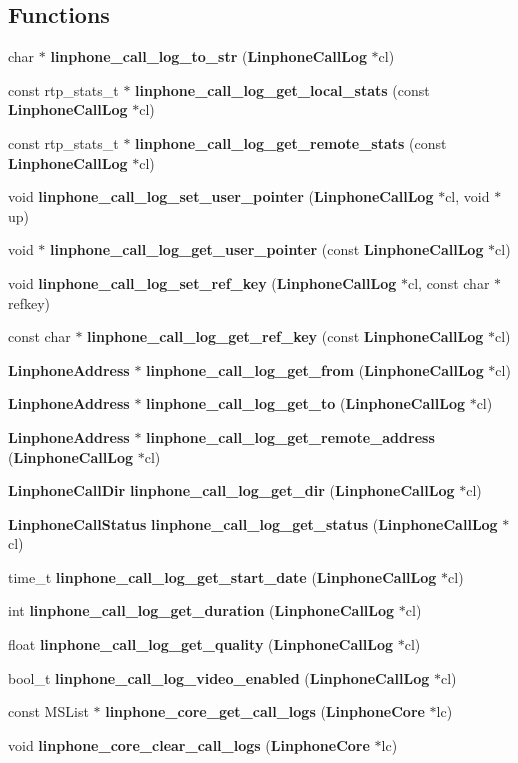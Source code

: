 \subsection*{Functions}
\begin{DoxyCompactItemize}
\item 
char $\ast$ {\bf linphone\-\_\-call\-\_\-log\-\_\-to\-\_\-str} ({\bf Linphone\-Call\-Log} $\ast$cl)
\item 
const rtp\-\_\-stats\-\_\-t $\ast$ {\bf linphone\-\_\-call\-\_\-log\-\_\-get\-\_\-local\-\_\-stats} (const {\bf Linphone\-Call\-Log} $\ast$cl)
\item 
const rtp\-\_\-stats\-\_\-t $\ast$ {\bf linphone\-\_\-call\-\_\-log\-\_\-get\-\_\-remote\-\_\-stats} (const {\bf Linphone\-Call\-Log} $\ast$cl)
\item 
void {\bf linphone\-\_\-call\-\_\-log\-\_\-set\-\_\-user\-\_\-pointer} ({\bf Linphone\-Call\-Log} $\ast$cl, void $\ast$up)
\item 
void $\ast$ {\bf linphone\-\_\-call\-\_\-log\-\_\-get\-\_\-user\-\_\-pointer} (const {\bf Linphone\-Call\-Log} $\ast$cl)
\item 
void {\bf linphone\-\_\-call\-\_\-log\-\_\-set\-\_\-ref\-\_\-key} ({\bf Linphone\-Call\-Log} $\ast$cl, const char $\ast$refkey)
\item 
const char $\ast$ {\bf linphone\-\_\-call\-\_\-log\-\_\-get\-\_\-ref\-\_\-key} (const {\bf Linphone\-Call\-Log} $\ast$cl)
\item 
{\bf Linphone\-Address} $\ast$ {\bf linphone\-\_\-call\-\_\-log\-\_\-get\-\_\-from} ({\bf Linphone\-Call\-Log} $\ast$cl)
\item 
{\bf Linphone\-Address} $\ast$ {\bf linphone\-\_\-call\-\_\-log\-\_\-get\-\_\-to} ({\bf Linphone\-Call\-Log} $\ast$cl)
\item 
{\bf Linphone\-Address} $\ast$ {\bf linphone\-\_\-call\-\_\-log\-\_\-get\-\_\-remote\-\_\-address} ({\bf Linphone\-Call\-Log} $\ast$cl)
\item 
{\bf Linphone\-Call\-Dir} {\bf linphone\-\_\-call\-\_\-log\-\_\-get\-\_\-dir} ({\bf Linphone\-Call\-Log} $\ast$cl)
\item 
{\bf Linphone\-Call\-Status} {\bf linphone\-\_\-call\-\_\-log\-\_\-get\-\_\-status} ({\bf Linphone\-Call\-Log} $\ast$cl)
\item 
time\-\_\-t {\bf linphone\-\_\-call\-\_\-log\-\_\-get\-\_\-start\-\_\-date} ({\bf Linphone\-Call\-Log} $\ast$cl)
\item 
int {\bf linphone\-\_\-call\-\_\-log\-\_\-get\-\_\-duration} ({\bf Linphone\-Call\-Log} $\ast$cl)
\item 
float {\bf linphone\-\_\-call\-\_\-log\-\_\-get\-\_\-quality} ({\bf Linphone\-Call\-Log} $\ast$cl)
\item 
bool\-\_\-t {\bf linphone\-\_\-call\-\_\-log\-\_\-video\-\_\-enabled} ({\bf Linphone\-Call\-Log} $\ast$cl)
\item 
const M\-S\-List $\ast$ {\bf linphone\-\_\-core\-\_\-get\-\_\-call\-\_\-logs} ({\bf Linphone\-Core} $\ast$lc)
\item 
void {\bf linphone\-\_\-core\-\_\-clear\-\_\-call\-\_\-logs} ({\bf Linphone\-Core} $\ast$lc)
\end{DoxyCompactItemize}


